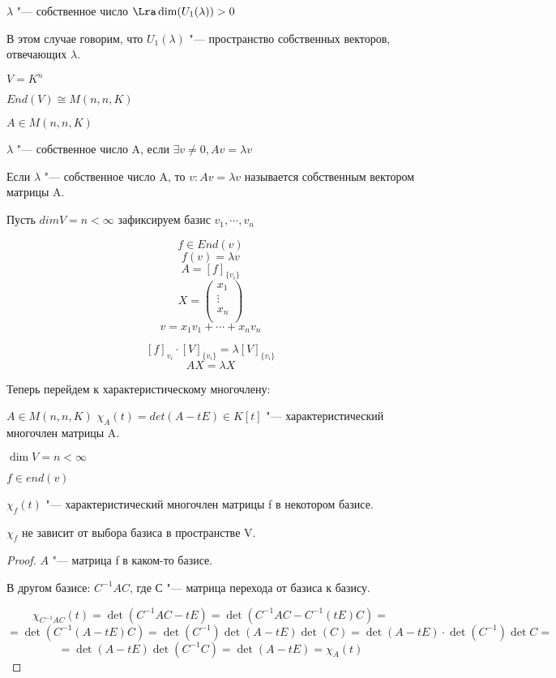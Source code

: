 $\lambda$ "--- собственное число $\Lra \dim(U_1(\lambda)) > 0$

В этом случае говорим, что $U_1(\lambda)$ "--- пространство собственных
векторов, отвечающих $\lambda$.

$V = K^{n}$ 

$End(V) \cong M(n, n, K)$

$A \in M(n, n, K)$ 

$\lambda$ "--- собственное число A, если $\exists v \ne 0,  Av = \lambda v$
                                                     
Если $\lambda$ "--- собственное число A, то $v\colon Av = \lambda v$ называется
собственным вектором матрицы A.

Пусть $dim V = n < \infty$
зафиксируем базис $v_1, \cdots, v_n$

$$f \in End(v)$$
$$f(v) = \lambda v$$
$$A = [f]_{\{v_i\}}$$
$$
X = \begin{pmatrix}
x_1\\
\vdots\\
x_n\\
\end{pmatrix}
$$
$$v = x_1v_1 + \cdots + x_nv_n $$

$$[f]_{v_i}\cdot[V]_{\{v_i\}} = \lambda[V]_{\{v_i\}}$$
$$AX = \lambda X$$


\begin{Def}
Теперь перейдем к характеристическому многочлену:

$A \in M(n, n, K)$
$\chi_{A}(t) = det(A - tE) \in K[t]$ "--- характеристический многочлен матрицы A.

$\dim V = n < \infty$

$f \in end(v)$

$\chi_{f}(t)$ "--- характеристический многочлен матрицы f в некотором базисе.
\end{Def}

\begin{Rem}
$\chi_f$ не зависит от выбора базиса в пространстве V.
\end{Rem}
\begin{proof}
$A$ "--- матрица f в каком-то базисе.

В другом базисе: $C^{-1}AC$, где С "--- матрица перехода от базиса к базису.

$$\chi_{C^{-1}AC}(t) = \det(C^{-1}AC - tE) = \det(C^{-1}AC - C^{-1}(tE)C) = $$
$$ = \det(C^{-1}(A - tE)C) = \det(C^{-1})\det(A - tE)\det(C) = \det(A - tE)\cdot\det(C^{-1})\det C =  $$
$$= \det(A - tE)\det(C^{-1}C) = \det(A - tE) = \chi_{A}(t) $$

\end{proof}


